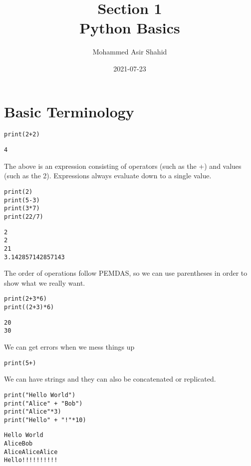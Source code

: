 \documentclass[11pt]{article}
\author{Mohammed Asir Shahid}
\date{2021-07-23}
\title{Section 1\\\medskip
\large Python Basics}
\begin{document}
\maketitle
\tableofcontents


\section{Basic Terminology}
\label{sec:orgd833fe7}


\begin{verbatim}
print(2+2)
\end{verbatim}

\begin{verbatim}
4
\end{verbatim}


The above is an expression consisting of operators (such as the +) and values (such as the 2). Expressions always evaluate down to a single value.

\begin{verbatim}
print(2)
print(5-3)
print(3*7)
print(22/7)
\end{verbatim}

\begin{verbatim}
2
2
21
3.142857142857143
\end{verbatim}


The order of operations follow PEMDAS, so we can use parentheses in order to show what we really want.


\begin{verbatim}
print(2+3*6)
print((2+3)*6)
\end{verbatim}

\begin{verbatim}
20
30
\end{verbatim}


We can get errors when we mess things up

\begin{verbatim}
print(5+)
\end{verbatim}

We can have strings and they can also be concatenated or replicated.

\begin{verbatim}
print("Hello World")
print("Alice" + "Bob")
print("Alice"*3)
print("Hello" + "!"*10)
\end{verbatim}

\begin{verbatim}
Hello World
AliceBob
AliceAliceAlice
Hello!!!!!!!!!!
\end{verbatim}
\end{document}
